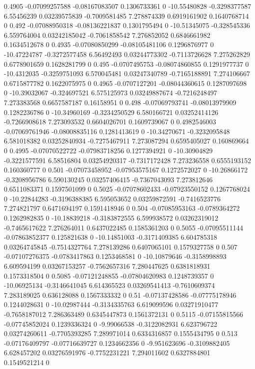 {0.4905 -0.07099257588 -0.08167083507 0.1306733361 0 -10.55480828 -0.3298377587 6.55456239 0.03239575839 -0.7009581485 7.278874339 0.6919161902 0.1640768714 0
0.492 -0.07088950318 -0.08136221837 0.1301795494 0 -10.51345075 -0.328545336 6.559764004 0.03242185042 -0.7061858542 7.276852052 0.6846661982 0.1634512678 0
0.4935 -0.07080850299 -0.08105481106 0.1296876977 0 -10.47224787 -0.3272577458 6.56492493 0.03244773302 -0.7113726628 7.275262829 0.6778901659 0.1628281799 0
0.495 -0.0707495753 -0.08074860855 0.1291977737 0 -10.4312035 -0.3259751093 6.570045481 0.03247340789 -0.7165188891 7.274106667 0.6715877782 0.1622075975 0
0.4965 -0.0707127201 -0.08044360615 0.1287097698 0 -10.39032067 -0.324697521 6.575125973 0.03249887674 -0.7216248497 7.273383568 0.6657587187 0.16158951 0
0.498 -0.07069793741 -0.08013979909 0.1282236786 0 -10.34960169 -0.3234250529 6.580166721 0.03252414126 -0.7266908618 7.273093532 0.6604026701 0.1609739067 0
0.4982546003 -0.07069761946 -0.08008835116 0.1281413619 0 -10.34270671 -0.3232095848 6.581018382 0.03252840934 -0.7275467911 7.273087294 0.6595405027 0.160869664 0
0.4995 -0.07070522722 -0.07983718256 0.1277394921 0 -10.30904829 -0.3221577591 6.58516804 0.03254920317 -0.7317172428 7.273236558 0.6555193152 0.160360777 0
0.501 -0.07073458952 -0.07953575167 0.1272572027 0 -10.26866172 -0.3208956786 6.590130245 0.03257406415 -0.7367043093 7.273812646 0.6511083371 0.1597501099 0
0.5025 -0.07078602433 -0.07923550152 0.1267768024 0 -10.22844283 -0.3196388385 6.595053652 0.03259872591 -0.7416523776 7.274821797 0.6471694197 0.1591418946 0
0.504 -0.07085953163 -0.0789364272 0.1262982835 0 -10.18839218 -0.3183872555 6.599938572 0.03262319012 -0.7465617622 7.276264011 0.6437022485 0.1585361203 0
0.5055 -0.07095511144 -0.07863852377 0.125821638 0 -10.14851003 -0.3171409385 6.604785318 0.03264745845 -0.7514327764 7.278139286 0.6407065101 0.1579327758 0
0.507 -0.07107276375 -0.0783417863 0.1253468581 0 -10.10879646 -0.3158998893 6.609594199 0.03267153257 -0.7562657316 7.280447625 0.6381818931 0.1573318504 0
0.5085 -0.07121248855 -0.07804620983 0.1248739357 0 -10.06925134 -0.3146641045 6.614365523 0.03269541413 -0.7610609374 7.283189025 0.636128088 0.1567333332 0
0.51 -0.07137428586 -0.07775178946 0.1244028631 0 -10.02987444 -0.3134335763 6.619099596 0.03271910477 -0.7658187012 7.286363489 0.6345447873 0.1561372131 0
0.5115 -0.07155815566 -0.07745852024 0.1239336324 0 -9.99066538 -0.3122082931 6.623796722 0.03274260611 -0.7705393285 7.289971014 0.6334316857 0.1555434795 0
0.513 -0.07176409797 -0.07716639727 0.1234662356 0 -9.951623696 -0.3109882405 6.628457202 0.03276591976 -0.7752231221 7.294011602 0.6327884801 0.1549521214 0
}
